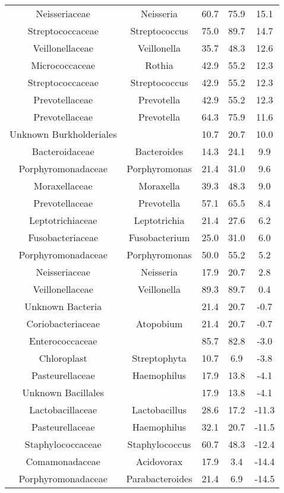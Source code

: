\documentclass{article}
\begin{document}
\begin{table}
\begin{center}
\begin{tabular}{ccccc}
	Neisseriaceae & Neisseria & 60.7 & 75.9 & 15.1 \\ 
	Streptococcaceae & Streptococcus & 75.0 & 89.7 & 14.7 \\ 
	Veillonellaceae & Veillonella & 35.7 & 48.3 & 12.6 \\ 
	Micrococcaceae & Rothia & 42.9 & 55.2 & 12.3 \\ 
	Streptococcaceae & Streptococcus & 42.9 & 55.2 & 12.3 \\ 
	Prevotellaceae & Prevotella & 42.9 & 55.2 & 12.3 \\ 
	Prevotellaceae & Prevotella & 64.3 & 75.9 & 11.6 \\ 
	Unknown Burkholderiales &  & 10.7 & 20.7 & 10.0 \\ 
	Bacteroidaceae & Bacteroides & 14.3 & 24.1 & 9.9 \\ 
	Porphyromonadaceae & Porphyromonas & 21.4 & 31.0 & 9.6 \\ 
	Moraxellaceae & Moraxella & 39.3 & 48.3 & 9.0 \\ 
	Prevotellaceae & Prevotella & 57.1 & 65.5 & 8.4 \\ 
	Leptotrichiaceae & Leptotrichia & 21.4 & 27.6 & 6.2 \\ 
	Fusobacteriaceae & Fusobacterium & 25.0 & 31.0 & 6.0 \\ 
	Porphyromonadaceae & Porphyromonas & 50.0 & 55.2 & 5.2 \\ 
	Neisseriaceae & Neisseria & 17.9 & 20.7 & 2.8 \\ 
	Veillonellaceae & Veillonella & 89.3 & 89.7 & 0.4 \\ 
	Unknown Bacteria &  & 21.4 & 20.7 & -0.7 \\ 
	Coriobacteriaceae & Atopobium & 21.4 & 20.7 & -0.7 \\ 
	Enterococcaceae &  & 85.7 & 82.8 & -3.0 \\ 
	Chloroplast & Streptophyta & 10.7 & 6.9 & -3.8 \\ 
	Pasteurellaceae & Haemophilus & 17.9 & 13.8 & -4.1 \\ 
	Unknown Bacillales &  & 17.9 & 13.8 & -4.1 \\ 
	Lactobacillaceae & Lactobacillus & 28.6 & 17.2 & -11.3 \\ 
	Pasteurellaceae & Haemophilus & 32.1 & 20.7 & -11.5 \\ 
	Staphylococcaceae & Staphylococcus & 60.7 & 48.3 & -12.4 \\ 
	Comamonadaceae & Acidovorax & 17.9 & 3.4 & -14.4 \\ 
	Porphyromonadaceae & Parabacteroides & 21.4 & 6.9 & -14.5 \\ 

\end{tabular}
\end{center}
\end{table}
\end{document}
